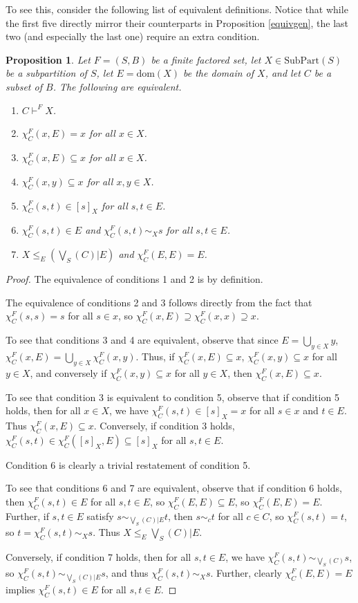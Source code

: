 \documentclass[authordate,onecolumn]{miri-tech-article}
\newtheorem{proposition}{Proposition}
\begin{document}
To see this, consider the following list of equivalent definitions. Notice that while the first five directly mirror their counterparts in Proposition \ref{equivgen}, the last two (and especially the last one) require an extra condition.
\begin{proposition}\label{equivsgen}
Let $F=(S,B)$ be a finite factored set, let $X\in \text{SubPart}(S)$ be a subpartition of $S$, let $E=\text{dom}(X)$ be the domain of $X$, and let $C$ be a subset of $B$. The following are equivalent.
\begin{enumerate}
    \item $C\vdash^F X$.
    \item $\chi^F_C(x,E)=x$ for all $x\in X$.
    \item $\chi^F_C(x,E)\subseteq x$ for all $x\in X$.
    \item $\chi^F_C(x,y)\subseteq x$ for all $x,y\in X$.
    \item $\chi^F_C(s,t)\in [s]_X$ for all $s,t\in E$.
    \item $\chi^F_C(s,t)\in E$ and $\chi^F_C(s,t)\sim_X s$ for all $s,t\in E$.
    \item $X\leq_E(\bigvee_S(C)|E)$ and $\chi^F_C(E,E)=E$.
\end{enumerate}
\end{proposition}
\begin{proof}
The equivalence of conditions 1 and 2 is by definition.

The equivalence of conditions 2 and 3 follows directly from the fact that $\chi^F_C(s,s)=s$ for all $s\in x$, so $\chi^F_C(x,E)\supseteq \chi^F_C(x,x)\supseteq x$.

To see that conditions 3 and 4 are equivalent, observe that since $E=\bigcup_{y\in X} y$, $\chi^F_C(x,E)=\bigcup_{y\in X}\chi^F_C(x,y)$. Thus, if $\chi^F_C(x,E)\subseteq x$, $\chi^F_C(x,y)\subseteq x$ for all $y\in X$, and conversely if $\chi^F_C(x,y)\subseteq x$ for all $y\in X$, then $\chi^F_C(x,E)\subseteq x$.

To see that condition 3 is equivalent to condition 5, observe that if condition 5 holds, then for all $x\in X$, we have $\chi^F_C(s,t)\in [s]_X=x$ for all $s\in x$ and  $t\in E$. Thus $\chi^F_C(x,E)\subseteq x$. Conversely, if condition 3 holds, $\chi^F_C(s,t)\in \chi^F_C([s]_X,E)\subseteq [s]_X$ for all $s,t\in E$.

Condition 6 is clearly a trivial restatement of condition 5.

To see that conditions 6 and 7 are equivalent, observe that if condition 6 holds, then $\chi_C^F(s,t)\in E$ for all $s,t\in E$, so $\chi_C^F(E,E)\subseteq E$, so $\chi_C^F(E,E)=E$. Further, if $s,t\in E$ satisfy $s\sim_{\bigvee_S(C)|E}t$, then $s\sim_{c}t$ for all $c\in C$, so $\chi^F_C(s,t)=t$, so $t=\chi^F_C(s,t)\sim_X s$. Thus $X\leq_E\bigvee_S(C)|E$. 

Conversely, if condition 7 holds, then for all $s,t\in E$, we have $\chi^F_C(s,t)\sim_{\bigvee_S(C)} s$, so $\chi^F_C(s,t)\sim_{\bigvee_S(C)|E} s$, and thus $\chi^F_C(s,t)\sim_{X} s$. Further, clearly $\chi_C^F(E,E)=E$ implies $\chi_C^F(s,t)\in E$ for all $s,t\in E$.

\end{proof}
\end{document}
